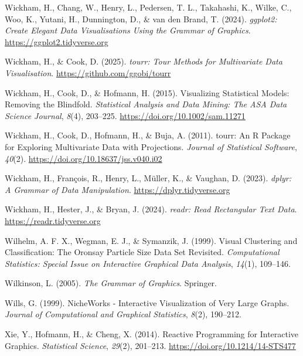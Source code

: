 \documentclass[
  letterpaper,
]{krantz}
\newlength{\cslhangindent}
\newenvironment{CSLReferences}[2] %
 {\begin{list}{}{%
  \setlength{\itemindent}{0pt}
  \setlength{\leftmargin}{0pt}
  \setlength{\parsep}{0pt}
  \ifodd #1
   \setlength{\leftmargin}{\cslhangindent}
   \setlength{\itemindent}{-1\cslhangindent}
  \fi
  \setlength{\itemsep}{#2\baselineskip}}}
 {\end{list}}
\begin{document}
\begin{CSLReferences}{1}{0}
{Wickham, H., Chang, W., Henry, L., Pedersen, T. L., Takahashi, K.,
Wilke, C., Woo, K., Yutani, H., Dunnington, D., \& van den Brand, T.}
(2024). \emph{{ggplot2}: {C}reate {E}legant {D}ata {V}isualisations
{U}sing the {G}rammar of {G}raphics}.
\url{https://ggplot2.tidyverse.org}

Wickham, H., \& Cook, D. (2025). \emph{{tourr}: {T}our {M}ethods for
{M}ultivariate {D}ata {V}isualisation}.
\url{https://github.com/ggobi/tourr}

Wickham, H., Cook, D., \& Hofmann, H. (2015). Visualizing {S}tatistical
{M}odels: {R}emoving the {B}lindfold. \emph{Statistical Analysis and
Data Mining: The ASA Data Science Journal}, \emph{8}(4), 203--225.
\url{https://doi.org/10.1002/sam.11271}

Wickham, H., Cook, D., Hofmann, H., \& Buja, A. (2011). {tourr}: {An}
{R} {Package} for {Exploring} {Multivariate} {Data} with {Projections}.
\emph{Journal of Statistical Software}, \emph{40}(2).
\url{https://doi.org/10.18637/jss.v040.i02}

Wickham, H., François, R., Henry, L., Müller, K., \& Vaughan, D. (2023).
\emph{{dplyr}: {A} {G}rammar of {D}ata {M}anipulation}.
\url{https://dplyr.tidyverse.org}

Wickham, H., Hester, J., \& Bryan, J. (2024). \emph{{readr}: {R}ead
{R}ectangular {T}ext {D}ata}. \url{https://readr.tidyverse.org}

Wilhelm, A. F. X., Wegman, E. J., \& Symanzik, J. (1999). Visual
{C}lustering and {C}lassification: {T}he {O}ronsay {P}article {S}ize
{D}ata {S}et {R}evisited. \emph{Computational Statistics: Special Issue
on Interactive Graphical Data Analysis}, \emph{14}(1), 109--146.

Wilkinson, L. (2005). \emph{The {G}rammar of {G}raphics}. Springer.

Wills, G. (1999). NicheWorks - {I}nteractive {V}isualization of {V}ery
{L}arge {G}raphs. \emph{Journal of Computational and Graphical
Statistics}, \emph{8}(2), 190--212.

Xie, Y., Hofmann, H., \& Cheng, X. (2014). {Reactive Programming for
Interactive Graphics}. \emph{Statistical Science}, \emph{29}(2),
201--213. \url{https://doi.org/10.1214/14-STS477}


\end{CSLReferences}
\end{document}
